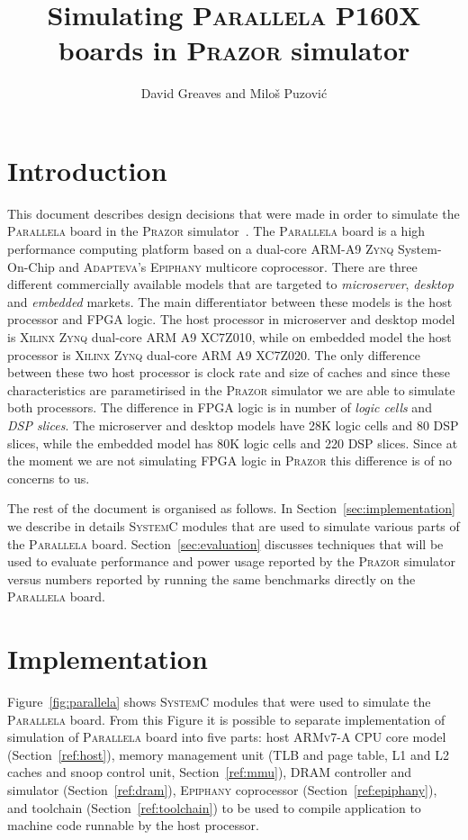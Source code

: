\documentclass{hitec}
\title{Simulating \textsc{Parallela} \textsc{P160X} boards in
  \textsc{Prazor} simulator}
\author{David Greaves and Milo\v{s} Puzovi\'c}
\begin{document}
\maketitle
\tableofcontents
\section{Introduction}
This document describes design decisions that were made in order to
simulate the \textsc{Parallela} board in the \textsc{Prazor}
simulator~\cite{parallela}. The \textsc{Parallela} board is a high performance
computing platform based on a dual-core \textsc{ARM-A9 Zynq}
System-On-Chip and \textsc{Adapteva}'s \textsc{Epiphany} multicore
coprocessor. There are three different commercially available models
that are targeted to \textit{microserver}, \textit{desktop} and
\textit{embedded} markets. The main differentiator between these
models is the host processor and FPGA logic. The host processor in
microserver and desktop model is \textsc{Xilinx Zynq} dual-core
\textsc{ARM A9 XC7Z010}, while on embedded model the host processor is
\textsc{Xilinx Zynq} dual-core \textsc{ARM A9 XC7Z020}. The only
difference between these two host processor is clock rate and size of
caches and since these characteristics are parametirised in the
\textsc{Prazor} simulator we are able to simulate both processors. The
difference in FPGA logic is in number of \textit{logic cells} and
\textit{DSP slices}. The microserver and desktop models have 28K logic
cells and 80 DSP slices, while the embedded model has 80K logic cells
and 220 DSP slices. Since at the moment we are not simulating FPGA
logic in \textsc{Prazor} this difference is of no concerns to us. 

The rest of the document is organised as follows. In
Section~\ref{sec:implementation} we describe in details
\textsc{SystemC} modules that are used to simulate various parts of
the \textsc{Parallela} board. Section~\ref{sec:evaluation} discusses
techniques that will be used to evaluate performance and power usage
reported by the \textsc{Prazor} simulator versus numbers reported by
running the same benchmarks directly on the \textsc{Parallela} board. 
\section{Implementation}
Figure~\ref{fig:parallela} shows \textsc{SystemC} modules that were
used to simulate the \textsc{Parallela} board. From this Figure it is
possible to separate implementation of simulation of
\textsc{Parallela} board into five parts: host \textsc{ARMv7-A} CPU core
model (Section~\ref{ref:host}), memory management unit (TLB and page table, L1 and L2 caches and snoop control
unit, Section~\ref{ref:mmu}), DRAM controller and simulator
(Section~\ref{ref:dram}), \textsc{Epiphany} coprocessor (Section~\ref{ref:epiphany}), 
and toolchain (Section~\ref{ref:toolchain}) to be used to compile application to machine code
runnable by the host processor. 
\end{document}
